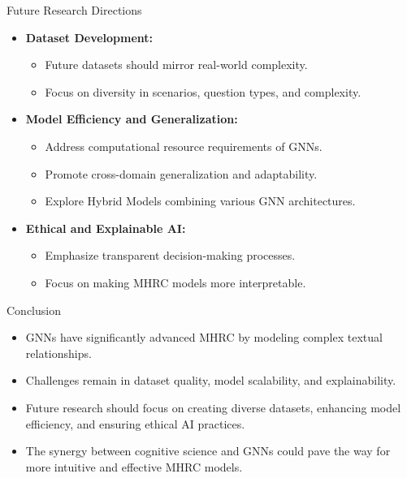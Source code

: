 \documentclass[10pt]{beamer}
\begin{document}
\begin{frame}{Future Research Directions}
  \begin{itemize}
    \item \textbf{Dataset Development:}
      \begin{itemize}
        \item Future datasets should mirror real-world complexity.
        \item Focus on diversity in scenarios, question types, and complexity.
      \end{itemize}
    \item \textbf{Model Efficiency and Generalization:}
      \begin{itemize}
        \item Address computational resource requirements of GNNs.
        \item Promote cross-domain generalization and adaptability.
        \item Explore Hybrid Models combining various GNN architectures.
      \end{itemize}
    \item \textbf{Ethical and Explainable AI:}
      \begin{itemize}
        \item Emphasize transparent decision-making processes.
        \item Focus on making MHRC models more interpretable.
      \end{itemize}
  \end{itemize}
\end{frame}

\begin{frame}{Conclusion}
  \begin{itemize}
    \item GNNs have significantly advanced MHRC by modeling complex textual relationships.
    \item Challenges remain in dataset quality, model scalability, and explainability.
    \item Future research should focus on creating diverse datasets, enhancing model efficiency, and ensuring ethical AI practices.
    \item The synergy between cognitive science and GNNs could pave the way for more intuitive and effective MHRC models.
  \end{itemize}
\end{frame}
\end{document}
